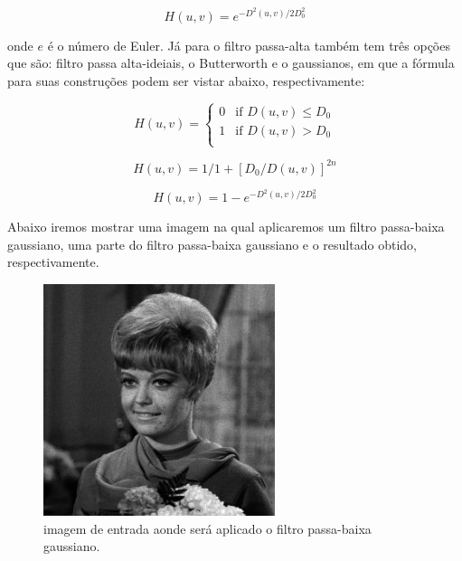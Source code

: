 \begin{equation}
	H(u , v) = e ^ {-D^2(u, v) / 2 D_0^2}
\end{equation}

onde $e$ é o número de Euler. Já para o filtro passa-alta também tem três opções que são: filtro passa alta-ideiais, o Butterworth e o gaussianos, em que a fórmula para suas construções podem ser vistar abaixo, respectivamente:

\[
	H(u, v) = 
	\begin{cases} 
        0 & \text{if $D(u, v) \leq D_0$}\\
        1 & \text{if $D(u, v) > D_0$}\\
   \end{cases}
\]

\begin{equation}
	H(u , v) = 1 / 1 + [D_0 / D(u, v)]^{2n}
\end{equation}

\begin{equation}
	H(u , v) = 1 - e ^ {-D^2(u, v) / 2 D_0^2}
\end{equation}

Abaixo iremos mostrar uma imagem na qual aplicaremos um filtro passa-baixa gaussiano, uma parte do filtro passa-baixa gaussiano e o resultado obtido, respectivamente.

\begin{figure}[!htb]
  \centering
  \includegraphics[scale=0.5]{pratica6.png}
  \caption{imagem de entrada aonde será aplicado o filtro passa-baixa gaussiano.}
\end{figure}

